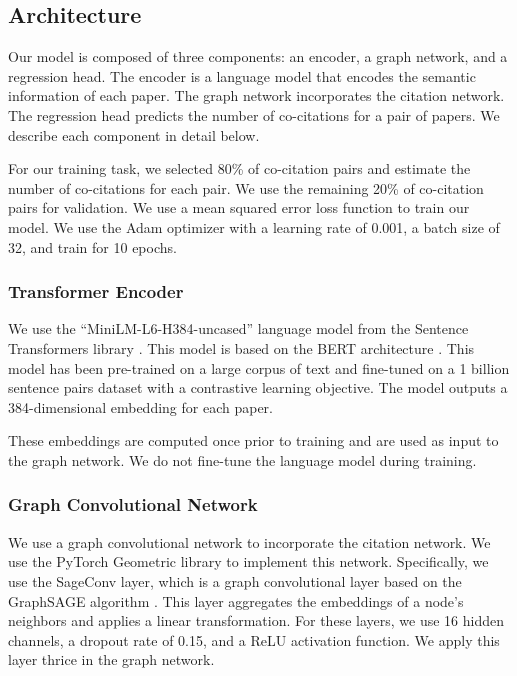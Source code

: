 \documentclass[10pt,twocolumn,letterpaper]{article}
\begin{document}
\subsection{Architecture}

Our model is composed of three components: an encoder, a graph network, and a regression head. 
The encoder is a language model that encodes the semantic information of each paper. The graph network incorporates the citation network. The regression head predicts the number of co-citations for a pair of papers. We describe each component in detail below.

For our training task, we selected 80\% of co-citation pairs and estimate the number of co-citations for each pair. We use the remaining 20\% of co-citation pairs for validation. 
We use a mean squared error loss function to train our model.
We use the Adam optimizer with a learning rate of 0.001, a batch size of 32, and train for 10 epochs.

\subsubsection{Transformer Encoder}

We use the ``MiniLM-L6-H384-uncased'' language model from the Sentence Transformers library \cite{reimers2019sentence}. This model is based on the BERT architecture \cite{devlin2018bert}. This model has been pre-trained on a large corpus of text and fine-tuned on a 1 billion sentence pairs dataset with a contrastive learning objective. The model outputs a 384-dimensional embedding for each paper.

These embeddings are computed once prior to training and are used as input to the graph network. We do not fine-tune the language model during training.

\subsubsection{Graph Convolutional Network}

We use a graph convolutional network to incorporate the citation network. We use the PyTorch Geometric library \cite{fey2019fast} to implement this network. Specifically, we use the SageConv layer, which is a graph convolutional layer based on the GraphSAGE algorithm \cite{hamilton2017inductive}. This layer aggregates the embeddings of a node's neighbors and applies a linear transformation. For these layers, we use 16 hidden channels, a dropout rate of 0.15, and a ReLU activation function. We apply this layer thrice in the graph network.
\end{document}
